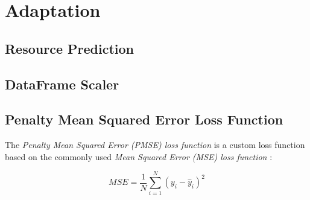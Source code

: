 
  

\section{Adaptation}
  \subsection{Resource Prediction}
  \subsection{DataFrame Scaler}
  \subsection{Penalty Mean Squared Error Loss Function}
  \label{sec:penalty-mse-loss-function-architecture-and-implementation}

    The \emph{Penalty Mean Squared Error (PMSE) loss function} is a custom loss function based on the commonly used \emph{Mean Squared Error (MSE) loss function} \cite{koksoyMultiresponseRobustDesign2006}:

    $$MSE = \frac{1}{N} \sum_{i = 1}^{N}\left(y_i - \hat{y}_i\right)^2$$

    


